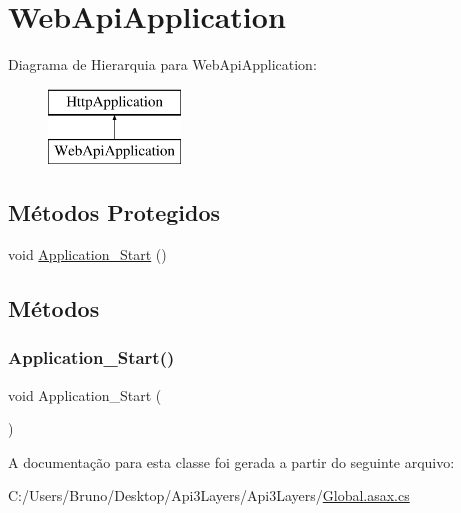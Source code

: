 \hypertarget{classApi3Layers_1_1WebApiApplication}{}\section{Web\+Api\+Application}
\label{classApi3Layers_1_1WebApiApplication}
Diagrama de Hierarquia para Web\+Api\+Application\+:\begin{figure}[H]
\begin{center}
\leavevmode
\includegraphics[height=2.000000cm]{d6/df2/classApi3Layers_1_1WebApiApplication}
\end{center}
\end{figure}
\subsection*{Métodos Protegidos}
\begin{DoxyCompactItemize}
\item 
void \hyperlink{classApi3Layers_1_1WebApiApplication_a71cc7d9b902e8fc085595da1960a157c}{Application\+\_\+\+Start} ()
\end{DoxyCompactItemize}


\subsection{Métodos}
\mbox{\label{classApi3Layers_1_1WebApiApplication_a71cc7d9b902e8fc085595da1960a157c}} 
\subsubsection{\texorpdfstring{Application\+\_\+\+Start()}{Application\_Start()}}
{\footnotesize\ttfamily void Application\+\_\+\+Start (\begin{DoxyParamCaption}{ }\end{DoxyParamCaption})\hspace{0.3cm}{\ttfamily [protected]}}



A documentação para esta classe foi gerada a partir do seguinte arquivo\+:\begin{DoxyCompactItemize}
\item 
C\+:/\+Users/\+Bruno/\+Desktop/\+Api3\+Layers/\+Api3\+Layers/\hyperlink{Global_8asax_8cs}{Global.\+asax.\+cs}\end{DoxyCompactItemize}

